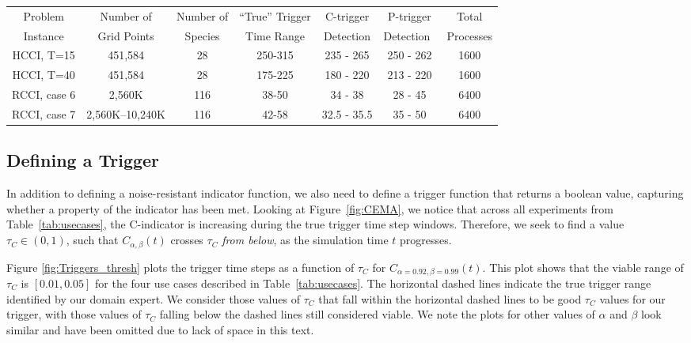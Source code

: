 \documentclass{sig-alternate}
\newcommand{\cmetric}{C}
\newcommand{\pmetric}{P}
\newcommand{\thresh}{\tau}
\begin{document}
\begin{table*}[tb]
{\small
  \caption{\label{tab:usecases} Four Combustion Use Cases analyzed in this
study. The ``true'' trigger time ranges are estimated based on $95-100^{\textrm{th}}$
percentiles of the heat release rate. The computed time ranges were evaluated
using our quantile sampling approach.  The \cmetric-trigger and \pmetric-trigger were
computed over 50 realizations of experiments with 20 samples per process.
}
\begin{center}
\begin{tabular}{|c|c|c|c|c|c|c|} 
 \hline
 Problem & Number of & Number of & ``True'' Trigger  & \cmetric-trigger &
 \pmetric -trigger  & Total \\
 Instance & Grid Points & Species & Time Range & Detection &
 Detection~\cite{cema-insitu}  & Processes \\ \hline\hline
 HCCI, T=15   & 451,584     & 28  & 250-315 & 235 - 265  & 250 - 262 & 1600 \\
 \hline
 HCCI, T=40   & 451,584     & 28  & 175-225 & 180 - 220  & 213 - 220 & 1600 \\
 \hline
 RCCI, case 6 & 2,560K   & 116 & 38-50   & 34 - 38 & 28 - 45 &  6400 \\
 \hline
 RCCI, case 7 & 2,560K--10,240K   & 116 & 42-58   & 32.5 - 35.5 & 35 - 50 & 6400 \\
 \hline
 \end{tabular}
 \end{center}
 } 
 \end{table*}


\subsection{Defining a Trigger}
\label{sec:trigger} 

In addition to defining a noise-resistant indicator function, we also need to define a trigger
function that returns a boolean value, capturing whether a property of the
indicator has been met. Looking at Figure~\ref{fig:CEMA}, we notice that across all
experiments from Table~\ref{tab:usecases}, the \cmetric-indicator is increasing during
the true trigger time step windows.  Therefore, we seek to find a value 
$\thresh_{\cmetric} \in (0,1)$, such that $\cmetric_{\alpha,\beta}(t)$
crosses $\thresh_{\cmetric}$ \emph{from
below}, as the simulation time $t$ progresses. 

Figure \ref{fig:Triggers_thresh} plots the trigger time steps as a function of
$\thresh_{\cmetric}$ for $\cmetric_{\alpha=0.92, \beta=0.99}(t)$. 
This plot shows that the viable range of $\thresh_{\cmetric}$ is $[ 0.01, 0.05]$
for the four use cases described in Table~\ref{tab:usecases}.  
The horizontal dashed lines indicate the true trigger range identified by our
domain expert.  We consider those values of $\thresh_{\cmetric}$ that fall
within the horizontal dashed lines to be good $\thresh_{\cmetric}$ values for our
trigger, with those values of $\thresh_{\cmetric}$ falling below the dashed
lines still considered viable.  
 We note the plots for other values of
$\alpha$ and $\beta$ look similar and have been omitted due to lack of space in
this text. 
\end{document}
